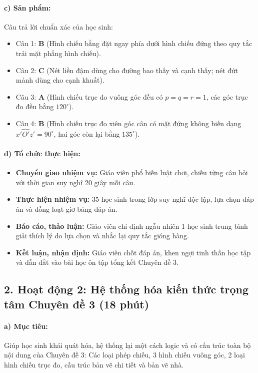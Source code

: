 \documentclass[12pt, a4paper]{article}
\begin{document}
\paragraph{c) Sản phẩm:} Câu trả lời chuẩn xác của học sinh:
\begin{itemize}[leftmargin=0.8cm]
    \item Câu 1: \textbf{B} (Hình chiếu bằng đặt ngay phía dưới hình chiếu đứng theo quy tắc trải mặt phẳng hình chiếu).
    \item Câu 2: \textbf{C} (Nét liền đậm dùng cho đường bao thấy và cạnh thấy; nét đứt mảnh dùng cho cạnh khuất).
    \item Câu 3: \textbf{A} (Hình chiếu trục đo vuông góc đều có $p = q = r = 1$, các góc trục đo đều bằng $120^\circ$).
    \item Câu 4: \textbf{B} (Hình chiếu trục đo xiên góc cân có mặt đứng không biến dạng $\widehat{x'O'z'} = 90^\circ$, hai góc còn lại bằng $135^\circ$).
\end{itemize}

\paragraph{d) Tổ chức thực hiện:}
\begin{itemize}[leftmargin=0.8cm]
    \item \textbf{Chuyển giao nhiệm vụ:} Giáo viên phổ biến luật chơi, chiếu từng câu hỏi với thời gian suy nghĩ 20 giây mỗi câu.
    \item \textbf{Thực hiện nhiệm vụ:} 35 học sinh trong lớp suy nghĩ độc lập, lựa chọn đáp án và đồng loạt giơ bảng đáp án.
    \item \textbf{Báo cáo, thảo luận:} Giáo viên chỉ định ngẫu nhiên 1 học sinh trung bình giải thích lý do lựa chọn và nhắc lại quy tắc gióng hàng.
    \item \textbf{Kết luận, nhận định:} Giáo viên chốt đáp án, khen ngợi tinh thần học tập và dẫn dắt vào bài học ôn tập tổng kết Chuyên đề 3.
\end{itemize}

\subsection*{2. Hoạt động 2: Hệ thống hóa kiến thức trọng tâm Chuyên đề 3 (18 phút)}

\paragraph{a) Mục tiêu:} Giúp học sinh khái quát hóa, hệ thống lại một cách logic và có cấu trúc toàn bộ nội dung của Chuyên đề 3: Các loại phép chiếu, 3 hình chiếu vuông góc, 2 loại hình chiếu trục đo, cấu trúc bản vẽ chi tiết và bản vẽ nhà.
\end{document}

